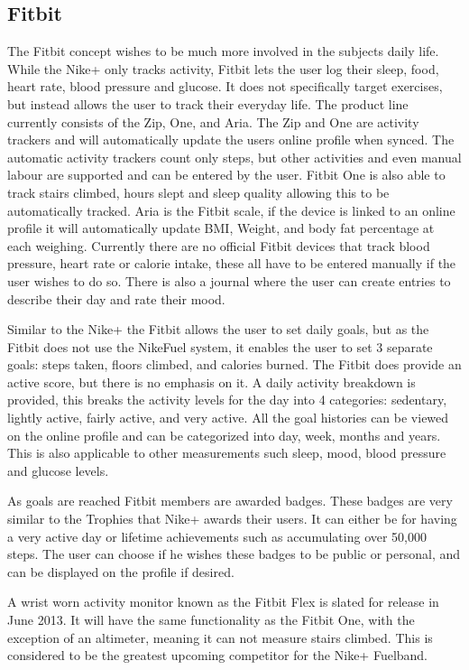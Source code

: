 \subsection{Fitbit}
The Fitbit concept wishes to be much more involved in the subjects daily life. While the Nike+ only tracks activity, Fitbit lets the user log their sleep, food, heart rate, blood pressure and glucose. It does not specifically target exercises, but instead allows the user to track their everyday life. The product line currently consists of the Zip, One, and Aria. The Zip and One are activity trackers and will automatically update the users online profile when synced. The automatic activity trackers count only steps, but other activities and even manual labour are supported and can be entered by the user. Fitbit One is also able to track stairs climbed, hours slept and sleep quality allowing this to be automatically tracked. Aria is the Fitbit scale, if the device is linked to an online profile it will automatically update BMI, Weight, and body fat percentage at each weighing. Currently there are no official Fitbit devices that track blood pressure, heart rate or calorie intake, these all have to be entered manually if the user wishes to do so. There is also a journal where the user can create entries to describe their day and rate their mood. %

Similar to the Nike+ the Fitbit allows the user to set daily goals, but as the Fitbit does not use the NikeFuel system, it enables the user to set 3 separate goals: steps taken, floors climbed, and calories burned. The Fitbit does provide an active score, but there is no emphasis on it. A daily activity breakdown is provided, this breaks the activity levels for the day into 4 categories: sedentary, lightly active, fairly active, and very active. All the goal histories can be viewed on the online profile and can be categorized into day, week, months and years. This is also applicable to other measurements such sleep, mood, blood pressure and glucose levels. 

As goals are reached Fitbit members are awarded badges. These badges are very similar to the Trophies that Nike+ awards their users. It can either be for having a very active day or lifetime achievements such as accumulating over 50,000 steps. The user can choose if he wishes these badges to be public or personal, and can be displayed on the profile if desired.

A wrist worn activity monitor known as the Fitbit Flex is slated for release in June 2013. It will have the same functionality as the Fitbit One, with the exception of an altimeter, meaning it can not measure stairs climbed. This is considered to be the greatest upcoming competitor for the Nike+ Fuelband. %



